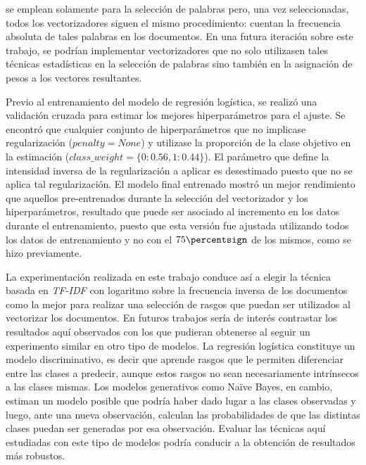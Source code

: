 \cite{monroe2008fightin} se emplean solamente
para la selecci\'on de palabras pero, una vez seleccionadas, todos
los vectorizadores siguen el mismo procedimiento: cuentan la frecuencia
absoluta de tales palabras en los documentos. En una futura iteraci\'on
sobre este trabajo, se podr\'ian implementar vectorizadores que
no solo utilizasen tales t\'ecnicas estad\'isticas en la selecci\'on
de palabras sino tambi\'en en la asignaci\'on de pesos a los vectores resultantes.
\par
Previo al entrenamiento del modelo de regresi\'on log\'istica, se
realiz\'o una validaci\'on cruzada para estimar los mejores hiperpar\'ametros
para el ajuste. Se encontr\'o que cualquier conjunto de hiperpar\'ametros
que no implicase regularizaci\'on ($penalty=None$) y utilizase
la proporci\'on de la clase objetivo en la estimaci\'on
($class\_weight=\lbrace0:0.56, 1:0.44\rbrace$). El par\'ametro que define
la intensidad inversa de la regularizaci\'on a aplicar es desestimado
puesto que no se aplica tal regularizaci\'on. El modelo final entrenado
mostr\'o un mejor rendimiento que aquellos pre-entrenados
durante la selecci\'on del vectorizador y los hiperpar\'ametros, resultado que
puede ser asociado al incremento en los datos durante el entrenamiento,
puesto que esta versi\'on fue ajustada utilizando todos los datos
de entrenamiento y no con el $75\percentsign$ de los mismos,
como se hizo previamente.
\par
La experimentaci\'on realizada en este trabajo conduce as\'i a elegir
la t\'ecnica basada en \textit{TF-IDF} con logaritmo sobre la
frecuencia inversa de los documentos como la mejor para
realizar una selecci\'on de rasgos que puedan ser utilizados al
vectorizar los documentos. En futuros trabajos ser\'ia de inter\'es
contrastar los resultados aqu\'i observados con los que pudieran obtenerse
al seguir un experimento similar en otro tipo de modelos.
La regresi\'on log\'istica constituye un modelo discriminativo, es decir
que aprende rasgos que le permiten diferenciar entre las clases
a predecir, aunque estos rasgos no sean necesariamente intr\'insecos
a las clases mismas. Los modelos generativos como Naïve Bayes, en cambio, estiman un
modelo posible que podr\'ia haber dado lugar a las clases observadas y
luego, ante una nueva observaci\'on, calculan las probabilidades de que
las distintas clases puedan ser generadas por esa observaci\'on.
Evaluar las t\'ecnicas aqu\'i estudiadas con este tipo de modelos podr\'ia
conducir a la obtenci\'on de resultados m\'as robustos.
\par
